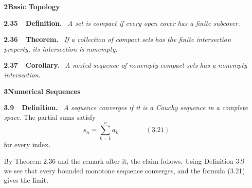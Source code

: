 \documentclass[11pt]{article}
\newcommand{\thmhead}[2]{\par\medskip\noindent\textbf{#1\ \ #2.}\ }
\begin{document}
\noindent\textbf{\Large 2\quad Basic Topology}
\medskip

\thmhead{2.35}{Definition}
\emph{A set is compact if every open cover has a finite subcover.}

\thmhead{2.36}{Theorem}
\emph{If a collection of compact sets has the finite intersection property, its intersection is nonempty.}

\thmhead{2.37}{Corollary}
\emph{A nested sequence of nonempty compact sets has a nonempty intersection.}
\clearpage

\noindent\textbf{\Large 3\quad Numerical Sequences}
\medskip

\thmhead{3.9}{Definition}
\emph{A sequence converges if it is a Cauchy sequence in a complete space.}
The partial sums satisfy
\[ s_n = \sum_{k=1}^{n} a_k \qquad\qquad (3.21) \]
for every index.

By Theorem 2.36 and the remark after it, the claim follows. Using Definition 3.9 we
see that every bounded monotone sequence converges, and the formula (3.21) gives the limit.
\end{document}
